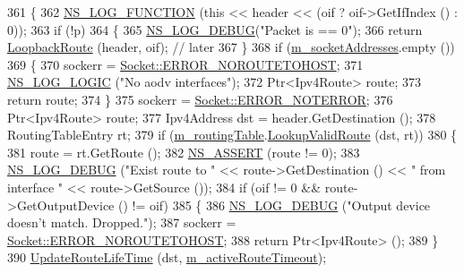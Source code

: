 \begin{DoxyCode}
361 \{
362   \hyperlink{log-macros-disabled_8h_a90b90d5bad1f39cb1b64923ea94c0761}{NS\_LOG\_FUNCTION} (\textcolor{keyword}{this} << header << (oif ? oif->GetIfIndex () : 0));
363   \textcolor{keywordflow}{if} (!p)
364     \{
365       \hyperlink{group__logging_ga413f1886406d49f59a6a0a89b77b4d0a}{NS\_LOG\_DEBUG}(\textcolor{stringliteral}{"Packet is == 0"});
366       \textcolor{keywordflow}{return} \hyperlink{classns3_1_1aodv_1_1RoutingProtocol_aa5a41c2ee6ff24a85cfa394d2e061762}{LoopbackRoute} (header, oif); \textcolor{comment}{// later}
367     \}
368   \textcolor{keywordflow}{if} (\hyperlink{classns3_1_1aodv_1_1RoutingProtocol_aa3263563cbbd735faafbf17fd4e28a10}{m\_socketAddresses}.empty ())
369     \{
370       sockerr = \hyperlink{classns3_1_1Socket_ada1328c5ae0c28cb2a982caf8f6d6ccaa0f8ecb5a4ddbce3bade35fa12c3d49e8}{Socket::ERROR\_NOROUTETOHOST};
371       \hyperlink{group__logging_ga88acd260151caf2db9c0fc84997f45ce}{NS\_LOG\_LOGIC} (\textcolor{stringliteral}{"No aodv interfaces"});
372       Ptr<Ipv4Route> route;
373       \textcolor{keywordflow}{return} route;
374     \}
375   sockerr = \hyperlink{classns3_1_1Socket_ada1328c5ae0c28cb2a982caf8f6d6ccaaa7eb006d73c5ad0117c5591fcb3469f7}{Socket::ERROR\_NOTERROR};
376   Ptr<Ipv4Route> route;
377   Ipv4Address dst = header.GetDestination ();
378   RoutingTableEntry rt;
379   \textcolor{keywordflow}{if} (\hyperlink{classns3_1_1aodv_1_1RoutingProtocol_a4e1003a34c8adc96db71096d88c98ae0}{m\_routingTable}.\hyperlink{classns3_1_1aodv_1_1RoutingTable_a2ca8c3757223d681d4cc39e2028fa7ad}{LookupValidRoute} (dst, rt))
380     \{
381       route = rt.GetRoute ();
382       \hyperlink{assert_8h_a6dccdb0de9b252f60088ce281c49d052}{NS\_ASSERT} (route != 0);
383       \hyperlink{group__logging_ga413f1886406d49f59a6a0a89b77b4d0a}{NS\_LOG\_DEBUG} (\textcolor{stringliteral}{"Exist route to "} << route->GetDestination () << \textcolor{stringliteral}{" from interface "} << 
      route->GetSource ());
384       \textcolor{keywordflow}{if} (oif != 0 && route->GetOutputDevice () != oif)
385         \{
386           \hyperlink{group__logging_ga413f1886406d49f59a6a0a89b77b4d0a}{NS\_LOG\_DEBUG} (\textcolor{stringliteral}{"Output device doesn't match. Dropped."});
387           sockerr = \hyperlink{classns3_1_1Socket_ada1328c5ae0c28cb2a982caf8f6d6ccaa0f8ecb5a4ddbce3bade35fa12c3d49e8}{Socket::ERROR\_NOROUTETOHOST};
388           \textcolor{keywordflow}{return} Ptr<Ipv4Route> ();
389         \}
390       \hyperlink{classns3_1_1aodv_1_1RoutingProtocol_a204c68e4ce5aa8dc799f9fd039f8cbc7}{UpdateRouteLifeTime} (dst, \hyperlink{classns3_1_1aodv_1_1RoutingProtocol_a37ec921ef1c48e4d8e7072fe989613d2}{m\_activeRouteTimeout});

\end{DoxyCode}
